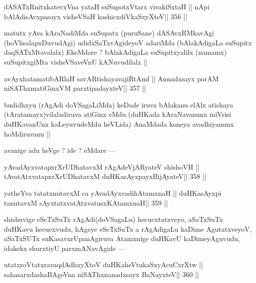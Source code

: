 \begin{shl}
dASATxRnitxkatevxVna yataH suSupotxV\s tarx vivakiSxtaH ||
nApi bAlAdisAvxpasayx visheVSaH kashicxdiVkaSxyXteV\hfill || 356 ||
\end{shl}

\begin{artha}
matutx yAva kAraNadiMda suSupatx (puruSane) dASAvxRMkavAgi (hoVlisalapxDuvudAgi) udidxSaTxvAgideyoV adariMda (bAlakAdigaLa suSupitx daqSATxMtavalalx) EkeMdare ? bAlakAdigaLa suSupitxyalilx (namamx) suSupitxgiMta visheVSaveVnU kANuvudilalx ||
\end{artha}

\begin{shl}
avAyxhatamatibARlaH savARtishayavajiRtAmf ||
Annadxsayx parAM niSAThxmatiGinxVM parxtipadayxteV\hfill || 357 ||
\end{shl}

\begin{artha}
budidhxyu (rAgAdi doVSagaLiMda) keDade iruva bAlakanu elAlx atishaya (tAratamayx)vilalxdiruva atiGinx eMdu (duHKada kAraNavanunx miVrisi duHKavanUnx kaLeyuvudeMdu heVLida) AnaMdada koneya avadhiyanunx hoMdiruvanu ||
\end{artha}

\begin{artha}
avanige adu heVge ? ide ? eMdare ---
\end{artha}

\begin{shl}
yAvadAyxvatapxrXrUDhatavxM rAgAdeVjARyateV shishoVH ||
tAvatAtxvatapxrXrUDhatavxM duHKasAyxpayxBijAyateV\hfill || 358 ||
\end{shl}

\begin{shl}
yatheYva tatatxnutavxM ca yAvadAyxvadihA\s\s tamxnaH ||
duHKasAyxpi tanutavxM sAyxtatxvatAtxvatusxKAtamxnaH\hfill || 359 ||
\end{shl}

\begin{artha}
shishuvige eSeTxSuTx rAgAdi(doVSagaLu) hecucxtatxveyo, aSaTxSuTx duHKavu hecucxvudu, hAgeye eSeTxSuTx a rAgAdigaLu kaDime AgutatxveyoV, aSaTxSUTx suKasavxrUpanAgiruva Atamxnige duHKavU kaDimeyAguvudu, idakekx shurxtiyU parxmANavAgide ---
\end{artha}

\begin{shl}
utatxroVtatxravaqdAdhxyX\s toV duHKaheVtukaSxyAcuCxrXtw ||
\footnotemark[1]sahasarxdashaBAgeVna niSAThx\s\s nanadxsayx BaNayxteV\hfill || 360 ||
\end{shl}

